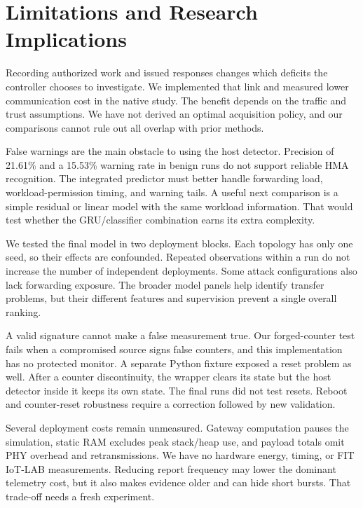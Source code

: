 \documentclass[journal]{IEEEtran}
\begin{document}
\section{Limitations and Research Implications}
Recording authorized work and issued responses changes which deficits the controller chooses to investigate. We implemented that link and measured lower communication cost in the native study. The benefit depends on the traffic and trust assumptions. We have not derived an optimal acquisition policy, and our comparisons cannot rule out all overlap with prior methods.

False warnings are the main obstacle to using the host detector. Precision of 21.61\% and a 15.53\% warning rate in benign runs do not support reliable HMA recognition. The integrated predictor must better handle forwarding load, workload-permission timing, and warning tails. A useful next comparison is a simple residual or linear model with the same workload information. That would test whether the GRU/classifier combination earns its extra complexity.

We tested the final model in two deployment blocks. Each topology has only one seed, so their effects are confounded. Repeated observations within a run do not increase the number of independent deployments. Some attack configurations also lack forwarding exposure. The broader model panels help identify transfer problems, but their different features and supervision prevent a single overall ranking.

A valid signature cannot make a false measurement true. Our forged-counter test fails when a compromised source signs false counters, and this implementation has no protected monitor. A separate Python fixture exposed a reset problem as well. After a counter discontinuity, the wrapper clears its state but the host detector inside it keeps its own state. The final runs did not test resets. Reboot and counter-reset robustness require a correction followed by new validation.

Several deployment costs remain unmeasured. Gateway computation pauses the simulation, static RAM excludes peak stack/heap use, and payload totals omit PHY overhead and retransmissions. We have no hardware energy, timing, or FIT IoT-LAB measurements. Reducing report frequency may lower the dominant telemetry cost, but it also makes evidence older and can hide short bursts. That trade-off needs a fresh experiment.
\end{document}
